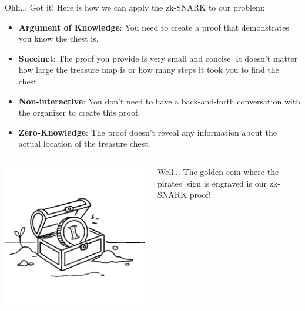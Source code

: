 \documentclass{zkdl-presentation-template}
\begin{document}
    \begin{frame}{Ohh... Got it!}
        Here is how we can apply the zk-SNARK to our problem:

        \begin{itemize} 
            \item \textbf{Argument of Knowledge}: You need to create a proof that demonstrates you know the
            chest is. 
            \item \textbf{Succinct}: The proof you provide is very small and concise. It doesn't matter how
            large the treasure map is or how many steps it took you to find the chest. 
            \item \textbf{Non-interactive}: You don't need to have a back-and-forth conversation with the 
            organizer to create this proof. 
            \item \textbf{Zero-Knowledge}: The proof doesn't reveal any information about the actual 
            location of the treasure chest.
        \end{itemize}
         \vspace{-10pt}
        \begin{columns}
            \begin{column}{0.3\textwidth}
                \includegraphics[width=\textwidth]{../presentations/images/lecture_8/treasure.png}
            \end{column}

            \begin{column}{0.65\textwidth}
                Well... The golden coin where the pirates' sign is engraved is our zk-SNARK proof!
            \end{column}
        \end{columns}
    \end{frame}
\end{document}
